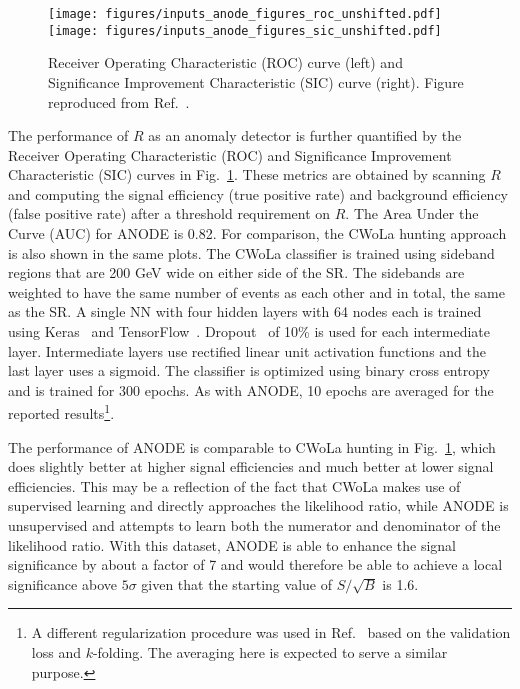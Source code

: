 \documentclass[a4paper,11pt]{article}
\begin{document}
\begin{figure}[h!]
\centering
\texttt{[image: figures/inputs\_anode\_figures\_roc\_unshifted.pdf]}\hspace{5mm}
\texttt{[image: figures/inputs\_anode\_figures\_sic\_unshifted.pdf]}
\caption{Receiver Operating Characteristic (ROC) curve (left) and Significance Improvement Characteristic (SIC) curve (right).  Figure reproduced from Ref.~\cite{Nachman:2020lpy}.}
\label{fig:ROC}
\end{figure}


The performance of $R$ as an anomaly detector is further quantified by the Receiver Operating Characteristic (ROC) and Significance Improvement Characteristic (SIC) curves in Fig.~\ref{fig:ROC}.  These metrics are obtained by scanning $R$ and computing the signal efficiency (true positive rate) and background efficiency (false positive rate) after a threshold requirement on $R$.  The Area Under the Curve (AUC) for ANODE is 0.82. For comparison, the CWoLa hunting approach is also shown in the same plots.  The CWoLa classifier is trained using sideband regions that are 200 GeV wide on either side of the SR.  The sidebands are weighted to have the same number of events as each other and in total, the same as the SR.  A single NN with four hidden layers with 64 nodes each is trained using Keras~\cite{keras} and TensorFlow~\cite{tensorflow}.   Dropout~\cite{JMLR:v15:srivastava14a} of 10\% is used for each intermediate layer.  Intermediate layers use rectified linear unit activation functions and the last layer uses a sigmoid.  The classifier is optimized using binary cross entropy and is trained for 300 epochs.  As with ANODE, 10 epochs are averaged for the reported results\footnote{A different regularization procedure was used in Ref.~\cite{Collins:2018epr,Collins:2019jip} based on the validation loss and $k$-folding.  The averaging here is expected to serve a similar purpose.}.

The performance of ANODE is comparable to CWoLa hunting in Fig.~\ref{fig:ROC}, which does slightly better at higher signal efficiencies and much better at lower signal efficiencies.  This may be a reflection of the fact that CWoLa makes use of supervised learning and directly approaches the likelihood ratio, while ANODE is unsupervised and attempts to learn both the numerator and denominator of the likelihood ratio.  With this dataset, ANODE is able to enhance the signal significance by about a factor of 7 and would therefore be able to achieve a local significance above $5\sigma$ given that the starting value of $S/\sqrt{B}$ is 1.6.
\end{document}
